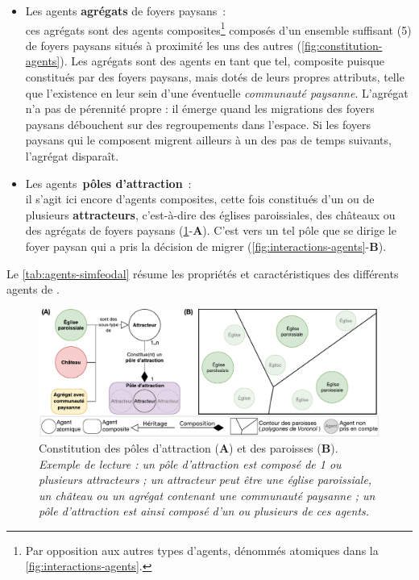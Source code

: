 \begin{itemize}
	\item Les agents \og \textbf{agrégats} de foyers paysans\fg{} : \\
	ces agrégats sont des agents \og composites\fg{}\footnote{
	Par opposition aux autres types d'agents, dénommés \og atomiques\fg{} dans la \cref{fig:interactions-agents}.
	} composés d'un ensemble suffisant (5) de foyers paysans situés à proximité les uns des autres (\cref{fig:constitution-agents}).
	Les agrégats sont des agents en tant que tel, composite puisque constitués par des foyers paysans, mais dotés de leurs propres attributs, telle que l'existence en leur sein d'une éventuelle \textit{communauté paysanne}.
	L'agrégat n'a pas de pérennité propre : il émerge quand les migrations des foyers paysans débouchent sur des regroupements dans l'espace.
	Si les foyers paysans qui le composent migrent ailleurs à un des pas de temps suivants, l'agrégat disparaît.
	
	\item Les agents \og \textbf{pôles d'attraction}\fg{} : \\
	il s'agit ici encore d'agents composites, cette fois constitués d'un ou de plusieurs \textbf{attracteurs}, c'est-à-dire des églises paroissiales, des châteaux ou des agrégats de foyers paysans (\cref{fig:constitution-poles-paroisses}-\textbf{A}).
	C'est vers un tel pôle que se dirige le foyer paysan qui a pris la décision de migrer (\cref{fig:interactions-agents}-\textbf{B}).
\end{itemize}

Le \cref{tab:agents-simfeodal} résume les propriétés et caractéristiques des différents agents de \simfeodal{}.

	\begin{figure}[H]
	\centering
	\includegraphics[width=\linewidth]{img/agents_paroisses_poles.pdf}
	\caption[Constitution des pôles d'attraction et des paroisses.]{Constitution des pôles d'attraction (\textbf{A}) et des paroisses (\textbf{B}).\\
		\textit{Exemple de lecture : un pôle d'attraction est composé de 1 ou plusieurs attracteurs ;
			un attracteur peut être une église paroissiale, un château ou un agrégat contenant une communauté paysanne ;
			un pôle d'attraction est ainsi composé d'un ou plusieurs de ces agents.}}
	\label{fig:constitution-poles-paroisses}
\end{figure}




